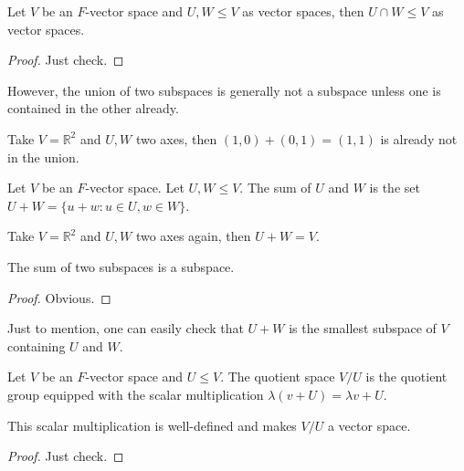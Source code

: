 \begin{proposition}
    Let $V$ be an $F$-vector space and $U,W\le V$ as vector spaces, then $U\cap W\le V$ as vector spaces.
\end{proposition}
\begin{proof}
    Just check.
\end{proof}
However, the union of two subspaces is generally not a subspace unless one is contained in the other already.
\begin{example}
    Take $V=\mathbb R^2$ and $U,W$ two axes, then $(1,0)+(0,1)=(1,1)$ is already not in the union.
\end{example}
\begin{definition}
    Let $V$ be an $F$-vector space.
    Let $U,W\le V$.
    The sum of $U$ and $W$ is the set $U+W=\{u+w:u\in U, w\in W\}$.
\end{definition}
\begin{example}
    Take $V=\mathbb R^2$ and $U,W$ two axes again, then $U+W=V$.
\end{example}
\begin{proposition}
    The sum of two subspaces is a subspace.
\end{proposition}
\begin{proof}
    Obvious.
\end{proof}
Just to mention, one can easily check that $U+W$ is the smallest subspace of $V$ containing $U$ and $W$.
\begin{definition}
    Let $V$ be an $F$-vector space and $U\le V$.
    The quotient space $V/U$ is the quotient group equipped with the scalar multiplication $\lambda(v+U)=\lambda v+U$.
\end{definition}
\begin{proposition}
    This scalar multiplication is well-defined and makes $V/U$ a vector space.
\end{proposition}
\begin{proof}
    Just check.
\end{proof}
